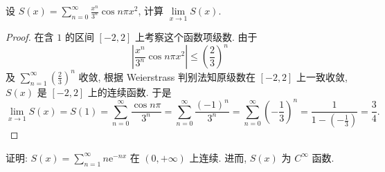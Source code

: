 \begin{example}\label{ex:13.2.8}
设 $S(x)=\sum_{n=0}^{\infty}\frac{x^{n}}{3^{n}}\cos n\pi x^{2}$, 计算 $\lim\limits_{x\to1}S(x)$.
\end{example}

\begin{proof}
在含 $1$ 的区间 $[-2,2]$ 上考察这个函数项级数. 由于
\[
  \left|\frac{x^{n}}{3^{n}}\cos n\pi x^{2}\right|\leqslant\left(\frac{2}{3}\right)^{n}
\]
及 $\sum_{n=1}^{\infty}\left(\frac{2}{3}\right)^{n}$ 收敛, 根据 Weierstrass 判别法知原级数在 $[-2,2]$ 上一致收敛, $S(x)$ 是 $[-2,2]$ 上的连续函数. 于是
\[
  \lim_{x\to1}S(x)=S(1)=\sum_{n=0}^{\infty}\frac{\cos n\pi}{3^{n}}=\sum_{n=0}^{\infty}\frac{(-1)^{n}}{3^{n}}=\sum_{n=0}^{\infty}\left(-\frac{1}{3}\right)^{n}=\frac{1}{1-\left(-\frac{1}{3}\right)}=\frac{3}{4}.
\]
\end{proof}

\begin{example}\label{ex:13.2.9}
证明: $S(x)=\sum_{n=1}^{\infty}n\mathrm{e}^{-nx}$ 在 $(0,+\infty)$ 上连续. 进而, $S(x)$ 为 $C^{\infty}$ 函数.
\end{example}

